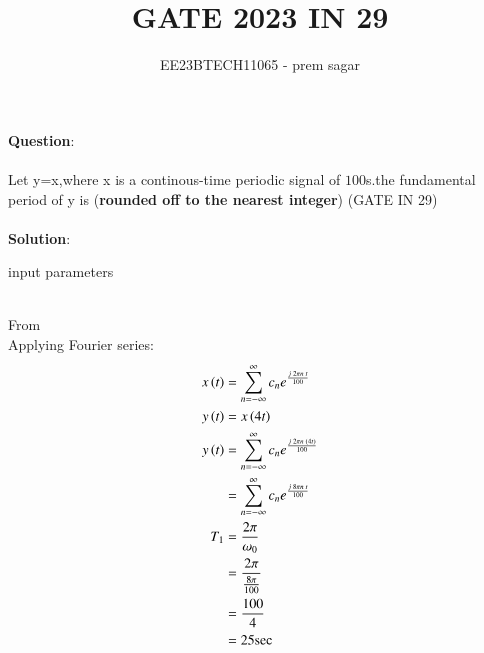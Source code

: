 \documentclass[journal,12pt,twocolumn]{IEEEtran}
\theoremstyle{remark}
\begin{document}

\vspace{3cm}

\title{GATE 2023 IN 29}
\author{EE23BTECH11065 - prem sagar}
\maketitle
\newpage

\bigskip 

\renewcommand{\thefigure}{\theenumi}
\renewcommand{\thetable}{\theenumi}
\textbf{Question}:
\\\\Let y=x,where x is a continous-time periodic signal of $100$s.the fundamental period of y is (\textbf{rounded off to the nearest integer})
 \hfill(GATE IN 29)
 \\\\\textbf{Solution}:
\begin{table}[!ht]
\def\arraystretch{1.5}
   \centering
    \renewcommand\thetable{1}
      
    \caption{input parameters}
    \label{tab:IN 29}
 \end{table}
\\From {}
\\Applying Fourier series:
 \begin{align}
 x\left(t\right)&=\sum_{n=-\infty}^{\infty}c_ne^\frac{j\;2\pi n\;t}{100}
\\ y\left(t\right)&=x\left(4t\right)
\\ y\left(t\right)&=\sum_{n=-\infty}^{\infty}c_ne^\frac{j\;2\pi n\;\left(4t\right)}{100}
\\&=\sum_{n=-\infty}^{\infty}c_ne^\frac{j\;8\pi n\;t}{100}
\\T_1&=\frac{2\pi}{\omega_0}
\\&=\frac{2\pi}{\frac{8\pi}{100}}
\\&=\frac{100}{4}
\\&=25\text{sec}
 \end{align}
\end{document}
